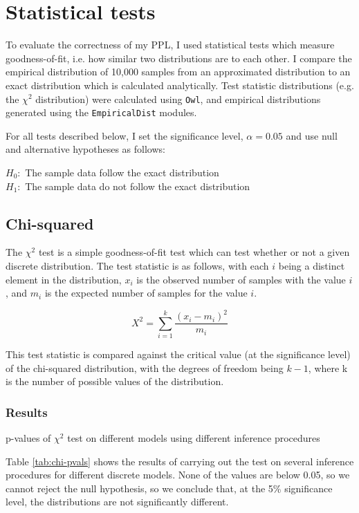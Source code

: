 \section{Statistical tests}
To evaluate the correctness of my PPL, I used statistical tests which measure goodness-of-fit, i.e. how similar two distributions are to each other. I compare the empirical distribution of 10,000 samples from an approximated distribution to an exact distribution which is calculated analytically. Test statistic distributions (e.g. the $\chi^2$ distribution) were calculated using \texttt{Owl}, and empirical distributions generated using the \texttt{EmpiricalDist} modules.

For all tests described below, I set the significance level, $\alpha = 0.05$ and use null and alternative hypotheses as follows:

$H_0:$ The sample data follow the exact distribution\\
$H_1:$ The sample data do not follow the exact distribution

\subsection{Chi-squared}

The $\chi^2$ test is a simple goodness-of-fit test which can test whether or not a given discrete distribution. The test statistic is as follows, with each $i$ being a distinct element in the distribution, $x_i$ is the observed number of samples with the value $i$, and $m_i$ is the expected number of samples for the value $i$.

$$X^{2}=\sum _{i=1}^{k}{\frac {(x_{i}-m_{i})^{2}}{m_{i}}}$$

This test statistic is compared against the critical value (at the significance level) of the chi-squared distribution, with the degrees of freedom being $k-1$, where k is the number of possible values of the distribution.
\subsubsection{Results}
\begin{table}[!ht]
	\centering
	\caption{p-values of $\chi^2$ test on different models using different inference procedures}
	\label{tab:chi-pvals}
\end{table}

Table \ref{tab:chi-pvals} shows the results of carrying out the test on several inference procedures for different discrete models. None of the values are below 0.05, so we cannot reject the null hypothesis, so we conclude that, at the 5\% significance level, the distributions are not significantly different.

